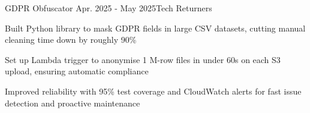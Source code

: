 \begin{rSubsection}{GDPR Obfuscator} {Apr. 2025 - May 2025}{Tech Returners}{}
\item Built Python library to mask GDPR fields in large CSV datasets, cutting manual cleaning time down by roughly 90\%
\item Set up Lambda trigger to anonymise 1 M-row files in under 60s on each S3 upload, ensuring automatic compliance
\item Improved reliability with 95\% test coverage and CloudWatch alerts for fast issue detection and proactive maintenance
\end{rSubsection}